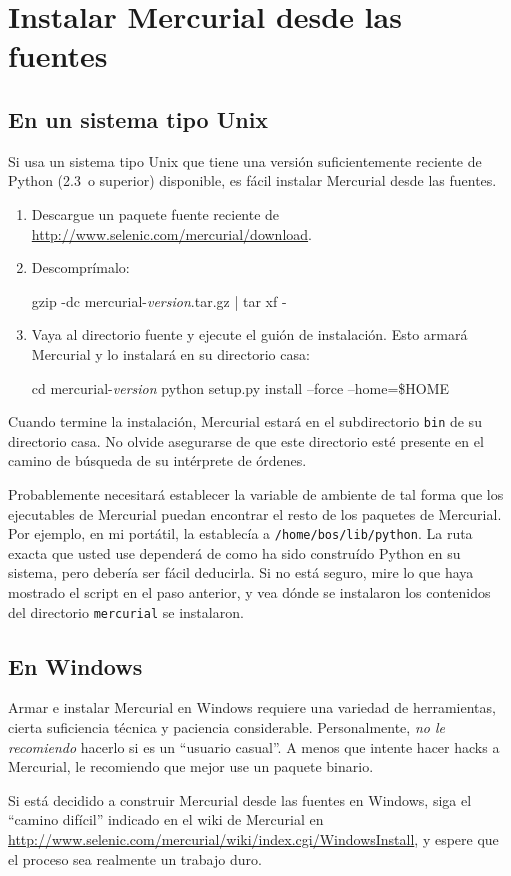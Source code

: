 \chapter{Instalar Mercurial desde las fuentes}
\label{chap:srcinstall}

\section{En un sistema tipo Unix}
\label{sec:srcinstall:unixlike}

Si usa un sistema tipo Unix que tiene una versión suficientemente
reciente de Python (2.3~o superior) disponible, es fácil instalar
Mercurial desde las fuentes.
\begin{enumerate}
\item Descargue un paquete fuente reciente de
  \url{http://www.selenic.com/mercurial/download}.
\item Descomprímalo:
  \begin{codesample4}
    gzip -dc mercurial-\emph{version}.tar.gz | tar xf -
  \end{codesample4}
\item Vaya al directorio fuente y ejecute el guión de instalación.
  Esto armará Mercurial y lo instalará en su directorio casa:
  \begin{codesample4}
    cd mercurial-\emph{version}
    python setup.py install --force --home=\$HOME
  \end{codesample4}
\end{enumerate}
Cuando termine la instalación, Mercurial estará en el subdirectorio
\texttt{bin} de su directorio casa.  No olvide asegurarse de que este
directorio esté presente en el camino de búsqueda de su intérprete de
órdenes.

Probablemente necesitará establecer la variable de ambiente
 de tal forma que los ejecutables de Mercurial
puedan encontrar el resto de los paquetes de Mercurial.  Por ejemplo,
en mi portátil, la establecía a \texttt{/home/bos/lib/python}.  La
ruta exacta que usted use dependerá de como ha sido construído Python
en su sistema, pero debería ser fácil deducirla.  Si no está seguro,
mire lo que haya mostrado el script en el paso anterior, y vea dónde
se instalaron los contenidos del directorio \texttt{mercurial} se
instalaron.

\section{En Windows}

Armar e instalar Mercurial en Windows requiere una variedad de
herramientas, cierta suficiencia técnica y paciencia considerable.
Personalmente, \emph{no le recomiendo} hacerlo si es un ``usuario
casual''.  A menos que intente hacer hacks a Mercurial, le recomiendo
que mejor use un paquete binario.

Si está decidido a construir Mercurial desde las fuentes en Windows,
siga el ``camino difícil'' indicado en el wiki de Mercurial en
\url{http://www.selenic.com/mercurial/wiki/index.cgi/WindowsInstall},
y espere que el proceso sea realmente un trabajo duro.

